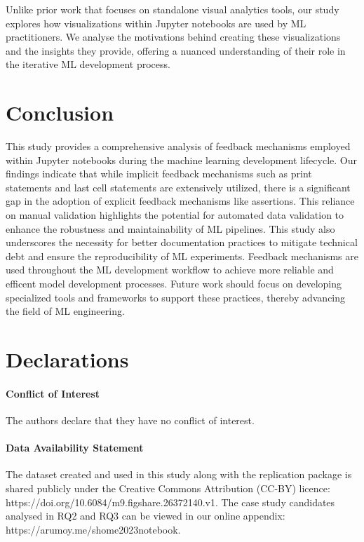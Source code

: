 \documentclass[smallextended]{svjour3}       %
\begin{document}
Unlike prior work that focuses on standalone visual analytics tools, our study explores how visualizations within Jupyter notebooks are used by ML practitioners. We analyse the motivations behind creating these visualizations and the insights they provide, offering a nuanced understanding of their role in the iterative ML development process.

\section{Conclusion}

This study provides a comprehensive analysis of feedback mechanisms employed within Jupyter notebooks during the machine learning development lifecycle. Our findings indicate that while implicit feedback mechanisms such as print statements and last cell statements are extensively utilized, there is a significant gap in the adoption of explicit feedback mechanisms like assertions. This reliance on manual validation highlights the potential for automated data validation to enhance the robustness and maintainability of ML pipelines. This study also underscores the necessity for better documentation practices to mitigate technical debt and ensure the reproducibility of ML experiments. Feedback mechanisms are used throughout the ML development workflow to achieve more reliable and efficent model development processes. Future work should focus on developing specialized tools and frameworks to support these practices, thereby advancing the field of ML engineering.

\section{Declarations}

\paragraph{\textbf{Conflict of Interest}} The authors declare that they have no conflict of interest.

\paragraph{\textbf{Data Availability Statement}} The dataset created and used in this study along with the replication package is shared publicly under the Creative Commons Attribution (CC-BY) licence: https://doi.org/10.6084/m9.figshare.26372140.v1. The case study candidates analysed in RQ2 and RQ3 can be viewed in our online appendix: https://arumoy.me/shome2023notebook.

\end{document}
